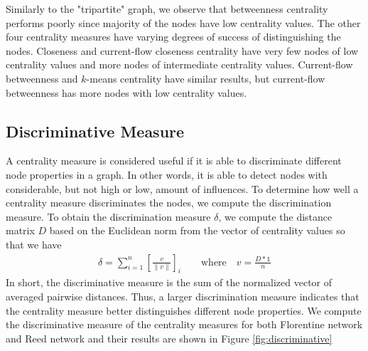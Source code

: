 \documentclass[10pt]{siamltex}
\begin{document}
\begin{pagewiselinenumbers}
Similarly to the "tripartite" graph, we observe that betweenness centrality performs poorly since majority of the nodes have low centrality values. The other four centrality measures have varying degrees of success of distinguishing the nodes. Closeness and current-flow closeness centrality have very few nodes of low centrality values and more nodes of intermediate centrality values. Current-flow betweenness and $k$-means centrality have similar results, but current-flow betweenness has more nodes with low centrality values.  



\subsection{Discriminative Measure}
A centrality measure is considered useful if it is able to discriminate different node properties in a graph. In other words, it is able to detect nodes with considerable, but not high or low, amount of influences. To determine how well a centrality measure discriminates the nodes, we compute the discrimination measure. To obtain the discrimination measure $\delta$, we compute the distance matrix $D$ based on the Euclidean norm from the vector of centrality values so that we have
\begin{align}
 	\delta=\sum_{i=1}^n \left[\frac{v}{\parallel v\parallel}\right]_i   \qquad \textrm{where} \quad v = \frac {D*\mathds{1}}{n}
\end{align}
In short, the discriminative measure is the sum of the normalized vector of averaged pairwise distances. Thus, a larger discrimination measure indicates that the centrality measure better distinguishes different node properties. We compute the discriminative measure of the centrality measures for both Florentine network and Reed network and their results are shown in Figure \ref{fig:discriminative}


\end{pagewiselinenumbers}
\end{document}
